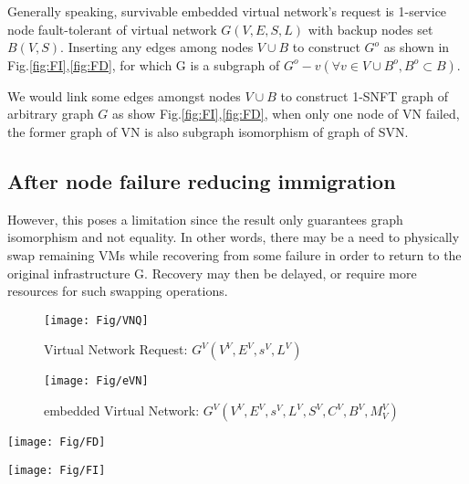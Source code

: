 Generally speaking, survivable embedded virtual network's request is 1-service node fault-tolerant of virtual network $G(V,E,S,L)$ with backup nodes set $B(V,S)$. Inserting any edges among nodes $V\cup B$ to construct $G^o$ as shown in Fig.\ref{fig:FI},\ref{fig:FD}, for which G is a subgraph of $G^o-v(\forall v\in V\cup B^o,B^o\subset B)$.

We would link some edges amongst nodes $V\cup B$ to construct 1-SNFT graph of arbitrary graph $G$ as show Fig.\ref{fig:FI},\ref{fig:FD}, when only one node of VN failed, the former graph of VN is also subgraph isomorphism of graph of SVN. %




\subsection{After node failure reducing immigration}
However, this poses a limitation since the result only guarantees graph isomorphism and not equality. In other words, there may be a need to physically swap remaining VMs while recovering from some failure in order to return to the original infrastructure G. Recovery may then be delayed, or require more resources for such swapping operations.





\begin{figure}
\centering
\texttt{[image: Fig/VNQ]}\\
\caption{Virtual Network Request: $G^V (V^V,E^V,s^V,L^V)$}\label{fig:VNQ}
\end{figure}

\begin{figure}
\centering
\texttt{[image: Fig/eVN]}\\
\caption{embedded Virtual Network: $G^V (V^V,E^V,s^V,L^V,S^V,C^V,B^V,M^V_V)$}\label{fig:eVN}
\end{figure}

\begin{figure*}
\centering
\begin{minipage}[t]{0.3\linewidth}
\centering
\texttt{[image: Fig/FD]}\\
\caption{ FD}\label{fig:FD}
\end{minipage}
\hfill
\begin{minipage}[t]{0.3\linewidth}
\centering
\texttt{[image: Fig/FI]}\\
\caption{FI}\label{fig:FI}
\end{minipage}
\end{figure*}




